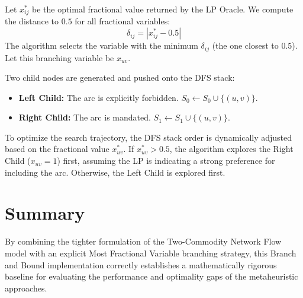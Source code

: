 \documentclass[11pt,a4paper]{article}
\begin{document}
Let $x_{ij}^*$ be the optimal fractional value returned by the LP Oracle. We compute the distance to $0.5$ for all fractional variables:
\[
  \delta_{ij} = | x_{ij}^* - 0.5 |
\]
The algorithm selects the variable with the minimum $\delta_{ij}$ (the one closest to $0.5$). Let this branching variable be $x_{uv}$. 

Two child nodes are generated and pushed onto the DFS stack:
\begin{itemize}
    \item \textbf{Left Child:} The arc is explicitly forbidden. $S_0 \leftarrow S_0 \cup \{(u, v)\}$.
    \item \textbf{Right Child:} The arc is mandated. $S_1 \leftarrow S_1 \cup \{(u, v)\}$.
\end{itemize}

To optimize the search trajectory, the DFS stack order is dynamically adjusted based on the fractional value $x_{uv}^*$. If $x_{uv}^* > 0.5$, the algorithm explores the Right Child ($x_{uv}=1$) first, assuming the LP is indicating a strong preference for including the arc. Otherwise, the Left Child is explored first.

\section{Summary}
By combining the tighter formulation of the Two-Commodity Network Flow model with an explicit Most Fractional Variable branching strategy, this Branch and Bound implementation correctly establishes a mathematically rigorous baseline for evaluating the performance and optimality gaps of the metaheuristic approaches.
\end{document}
